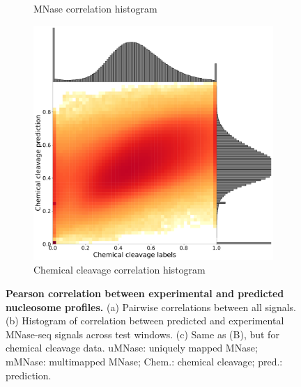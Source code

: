 \documentclass[11pt]{book}
\begin{document}
\begin{figure}[htbp]
\begin{subfigure}[c]{0.32\textwidth}
        \caption{MNase correlation histogram}
        \label{fig:corr_mnase_hist}
    \end{subfigure}
    \hfill
    \begin{subfigure}[c]{0.25\textwidth}
        \includegraphics[width=\linewidth]{Figures/Results/test_set_chem_histogram.pdf}
        \caption{Chemical cleavage correlation histogram}
        \label{fig:corr_chem_hist}
    \end{subfigure}
    \caption{\textbf{Pearson correlation between experimental and predicted nucleosome profiles.} (a) Pairwise correlations between all signals. (b) Histogram of correlation between predicted and experimental MNase-seq signals across test windows. (c) Same as (B), but for chemical cleavage data. uMNase: uniquely mapped MNase; mMNase: multimapped MNase; Chem.: chemical cleavage; pred.: prediction.}
    \label{fig:corr_overview}
\end{figure} 
\end{document}
